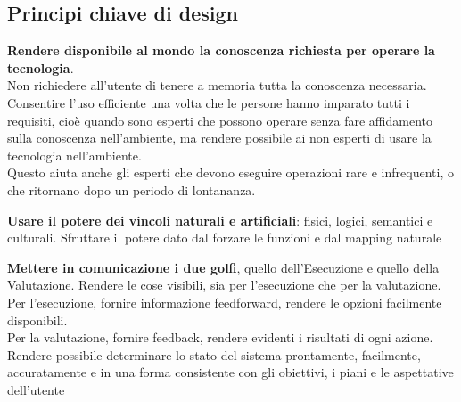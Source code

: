 \documentclass[10pt]{article}
\begin{document}
\subsection{Principi chiave di design}
\begin{list}{}{}
\item \textbf{Rendere disponibile al mondo la conoscenza richiesta per operare la tecnologia}.\\
Non richiedere all'utente di tenere a memoria tutta la conoscenza necessaria. Consentire l'uso efficiente una volta che le persone hanno imparato tutti i requisiti, cioè quando sono esperti che possono operare senza fare affidamento sulla conoscenza nell'ambiente, ma rendere possibile ai non esperti di usare la tecnologia nell'ambiente.\\
Questo aiuta anche gli esperti che devono eseguire operazioni rare e infrequenti, o che ritornano dopo un periodo di lontananza.
\item \textbf{Usare il potere dei vincoli naturali e artificiali}: fisici, logici, semantici e culturali. Sfruttare il potere dato dal forzare le funzioni e dal mapping naturale
\item \textbf{Mettere in comunicazione i due golfi}, quello dell'Esecuzione e quello della Valutazione. Rendere le cose visibili, sia per l'esecuzione che per la valutazione.\\
Per l'esecuzione, fornire informazione feedforward, rendere le opzioni facilmente disponibili.\\
Per la valutazione, fornire feedback, rendere evidenti i risultati di ogni azione.\\
Rendere possibile determinare lo stato del sistema prontamente, facilmente, accuratamente e in una forma consistente con gli obiettivi, i piani e le aspettative dell'utente
\end{list}
\end{document}
